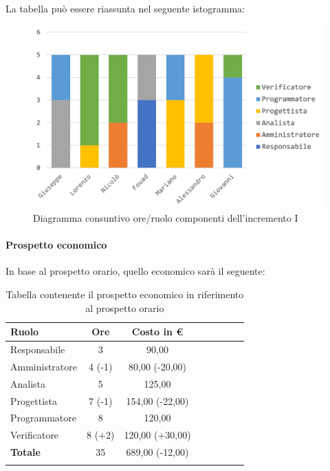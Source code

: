 			La tabella può essere riassunta nel seguente istogramma:
			
			\begin{figure}[H]
				\centering
				\includegraphics[width=0.8\linewidth]{images/consuntivo/ConsIncr1-1.png}
				\caption{Diagramma consuntivo ore/ruolo componenti dell'incremento I}
				\label{fig:consuntivo diagramma suddivione ruoli incremento I}
			\end{figure}
			
		\paragraph{Prospetto economico}
			In base al prospetto orario, quello economico sarà il seguente: 
			
			\begin{longtable}{|l|c|c|c|c|c|c|c|}
				\hline
				\rowcolor{lighter-grayer}
				\textbf{Ruolo} & \textbf{Ore} & \textbf{Costo in €} \\
				\hline
				\endfirsthead
				\hline
			Responsabile 	    & 3 & 90,00\\
			\hline 
			\hline
			Amministratore	  & 4 (-1)& 80,00 (-20,00)\\
			\hline
			\hline
			Analista 				& 5 & 125,00\\
			\hline
			\hline
			Progettista 		  & 7 (-1) & 154,00 (-22,00)\\
			\hline
			\hline
			Programmatore 	 & 8 & 120,00\\
			\hline
			\hline
			Verificatore 		  & 8 (+2) & 120,00 (+30,00)\\
			\hline
			\textbf{Totale} 	& 35 & 689,00 (-12,00)\\
			\hline
				
				\caption{Tabella contenente il prospetto economico in riferimento al prospetto orario}
			\end{longtable}
		\pagebreak
			
